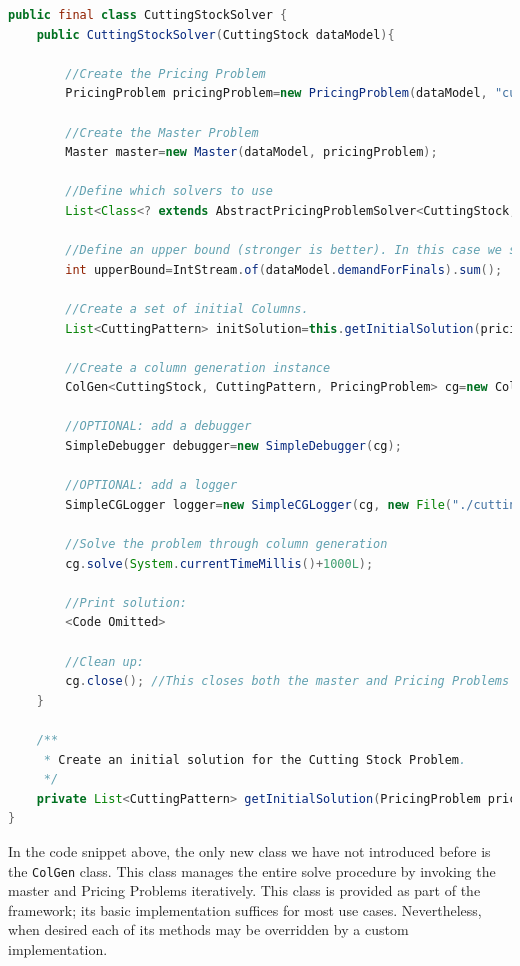 \documentclass[a4paper]{article}
\newenvironment{myblock}[1]{%
    \tcolorbox[beamer,%
    noparskip,breakable,
    colback=lightBlueCodeBlock,colframe=darkBlueCodeBlock,%
    colbacklower=darkBlueCodeBlock!75!lightBlueCodeBlock,%
    coltitle=blueTitleCodeBlock,
    title=#1]}%
    {\endtcolorbox}
\newcommand{\code}[1]{\lstinline[language=java, style=seminar]!#1!}
\begin{document}
\begin{myblock}{CuttingStockSolver}
\begin{lstlisting}[language=java, style=eclipseArticle, xleftmargin=2em]  
public final class CuttingStockSolver {
	public CuttingStockSolver(CuttingStock dataModel){

		//Create the Pricing Problem
		PricingProblem pricingProblem=new PricingProblem(dataModel, "cuttingStockPricing");

		//Create the Master Problem
		Master master=new Master(dataModel, pricingProblem);

		//Define which solvers to use
		List<Class<? extends AbstractPricingProblemSolver<CuttingStock, CuttingPattern, PricingProblem>>> solvers= Collections.singletonList(ExactPricingProblemSolver.class);

		//Define an upper bound (stronger is better). In this case we simply sum the demands, i.e. cut each final from its own raw (Rather poor initial solution).
		int upperBound=IntStream.of(dataModel.demandForFinals).sum();

		//Create a set of initial Columns.
		List<CuttingPattern> initSolution=this.getInitialSolution(pricingProblem);

		//Create a column generation instance
		ColGen<CuttingStock, CuttingPattern, PricingProblem> cg=new ColGen<>(dataModel, master, pricingProblem, solvers, initSolution, upperBound);

		//OPTIONAL: add a debugger
		SimpleDebugger debugger=new SimpleDebugger(cg);

		//OPTIONAL: add a logger
		SimpleCGLogger logger=new SimpleCGLogger(cg, new File("./cuttingStock.log"));

		//Solve the problem through column generation
		cg.solve(System.currentTimeMillis()+1000L);

		//Print solution:
		<Code Omitted>
		
		//Clean up:
		cg.close(); //This closes both the master and Pricing Problems
	}
	
	/**
	 * Create an initial solution for the Cutting Stock Problem.
	 */
	private List<CuttingPattern> getInitialSolution(PricingProblem pricingProblem){<Code Omitted>}
}
\end{lstlisting}
\end{myblock}
In the code snippet above, the only new class we have not introduced before is the \code{ColGen} class. This class manages the entire solve procedure by invoking the master and Pricing Problems iteratively. This class is provided as part of the framework; its basic implementation suffices for most use cases. Nevertheless, when desired each of its methods may be overridden by a custom implementation.
\end{document}
